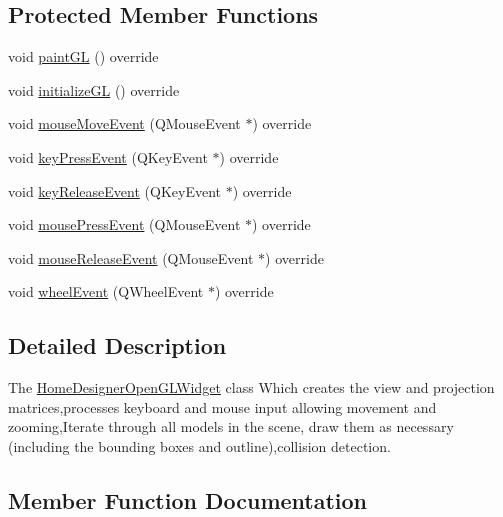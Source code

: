 \subsection*{Protected Member Functions}
\begin{DoxyCompactItemize}
\item 
void \hyperlink{class_home_designer_open_g_l_widget_a4222406ea010bada5b614f4aa9a408e3}{paint\+G\+L} () override
\item 
void \hyperlink{class_home_designer_open_g_l_widget_ab4d259ef3a1e4d80cc784f04d1e0da1f}{initialize\+G\+L} () override
\item 
void \hyperlink{class_home_designer_open_g_l_widget_a9374ffef11f1f4be2eb7070e2a13ee65}{mouse\+Move\+Event} (Q\+Mouse\+Event $\ast$) override
\item 
void \hyperlink{class_home_designer_open_g_l_widget_a44f26dde734bb6b1b4e30c4c2b2a6d9a}{key\+Press\+Event} (Q\+Key\+Event $\ast$) override
\item 
void \hyperlink{class_home_designer_open_g_l_widget_aca029316bc95418bb9c6f8c372a74b0d}{key\+Release\+Event} (Q\+Key\+Event $\ast$) override
\item 
void \hyperlink{class_home_designer_open_g_l_widget_a89d62b03f15537ab73b7cd7af1346967}{mouse\+Press\+Event} (Q\+Mouse\+Event $\ast$) override
\item 
void \hyperlink{class_home_designer_open_g_l_widget_ab06746a2be49de22f1e3eac9cd34f49c}{mouse\+Release\+Event} (Q\+Mouse\+Event $\ast$) override
\item 
void \hyperlink{class_home_designer_open_g_l_widget_ac9a825748af7eaeb41bfe51fd5f99c1a}{wheel\+Event} (Q\+Wheel\+Event $\ast$) override
\end{DoxyCompactItemize}


\subsection{Detailed Description}
The \hyperlink{class_home_designer_open_g_l_widget}{Home\+Designer\+Open\+G\+L\+Widget} class Which creates the view and projection matrices,processes keyboard and mouse input allowing movement and zooming,Iterate through all models in the scene, draw them as necessary (including the bounding boxes and outline),collision detection. 

\subsection{Member Function Documentation}
\hypertarget{class_home_designer_open_g_l_widget_a9e4a4bfa55e86426d28ba0589035cec9}{}
